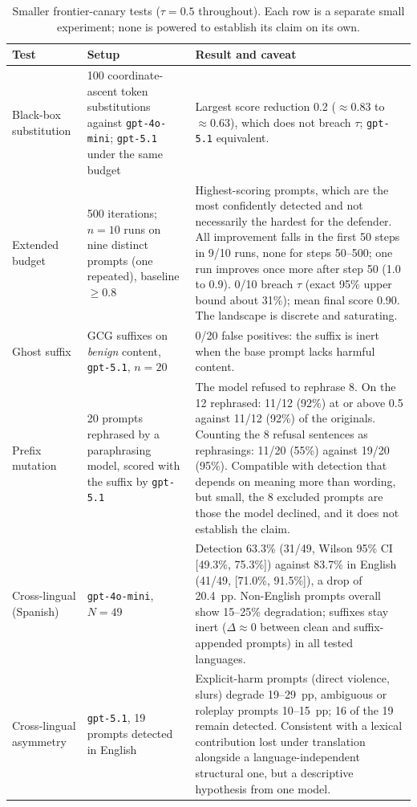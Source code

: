 \documentclass{article}
\begin{document}
\begin{table}[h]
\centering
\footnotesize
\caption{Smaller frontier-canary tests ($\tau = 0.5$ throughout). Each row is a separate small experiment; none is powered to establish its claim on its own.}
\label{tab:llm-checks}
\begin{tabular}{p{2.3cm}p{3.4cm}p{6.6cm}}
\toprule
\textbf{Test} & \textbf{Setup} & \textbf{Result and caveat} \\
\midrule
Black-box substitution & 100 coordinate-ascent token substitutions against \texttt{gpt-4o-mini}; \texttt{gpt-5.1} under the same budget & Largest score reduction 0.2 ($\approx 0.83$ to $\approx 0.63$), which does not breach $\tau$; \texttt{gpt-5.1} equivalent. \\
Extended budget & 500 iterations; $n = 10$ runs on nine distinct prompts (one repeated), baseline $\geq 0.8$ & Highest-scoring prompts, which are the most confidently detected and not necessarily the hardest for the defender. All improvement falls in the first 50 steps in 9/10 runs, none for steps 50--500; one run improves once more after step 50 (1.0 to 0.9). 0/10 breach $\tau$ (exact 95\% upper bound about 31\%); mean final score 0.90. The landscape is discrete and saturating. \\
Ghost suffix & GCG suffixes on \emph{benign} content, \texttt{gpt-5.1}, $n = 20$ & 0/20 false positives: the suffix is inert when the base prompt lacks harmful content. \\
Prefix mutation & 20 prompts rephrased by a paraphrasing model, scored with the suffix by \texttt{gpt-5.1} & The model refused to rephrase 8. On the 12 rephrased: 11/12 (92\%) at or above 0.5 against 11/12 (92\%) of the originals. Counting the 8 refusal sentences as rephrasings: 11/20 (55\%) against 19/20 (95\%). Compatible with detection that depends on meaning more than wording, but small, the 8 excluded prompts are those the model declined, and it does not establish the claim. \\
Cross-lingual (Spanish) & \texttt{gpt-4o-mini}, $N = 49$ & Detection 63.3\% (31/49, Wilson 95\% CI [49.3\%, 75.3\%]) against 83.7\% in English (41/49, [71.0\%, 91.5\%]), a drop of 20.4~pp. Non-English prompts overall show 15--25\% degradation; suffixes stay inert ($\Delta \approx 0$ between clean and suffix-appended prompts) in all tested languages. \\
Cross-lingual asymmetry & \texttt{gpt-5.1}, 19 prompts detected in English & Explicit-harm prompts (direct violence, slurs) degrade 19--29~pp, ambiguous or roleplay prompts 10--15~pp; 16 of the 19 remain detected. Consistent with a lexical contribution lost under translation alongside a language-independent structural one, but a descriptive hypothesis from one model. \\
\bottomrule
\end{tabular}
\end{table}
\end{document}
